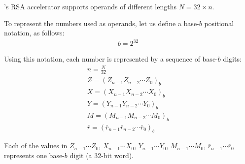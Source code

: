\documentclass[main\_\_EN.tex]{subfiles}
\begin{document}
\chipname{}'s RSA accelerator supports operands of different lengths \begin{math}N = 32 \times n\end{math}.

To represent the numbers used as operands, let us define a base-\begin{math}b\end{math} positional notation, as follows:
\begin{gather*}
    b = 2^{32}
\end{gather*}

Using this notation, each number is represented by a sequence of base-\begin{math}b\end{math} digits:
\begin{gather*}
    n = \frac{N}{32} \\
    Z = ( Z_{n-1} Z_{n-2} \cdots Z_{0} )_{b} \\
    X = ( X_{n-1} X_{n-2} \cdots X_{0} )_{b} \\
    Y = ( Y_{n-1} Y_{n-2} \cdots Y_{0} )_{b} \\
    M = ( M_{n-1} M_{n-2} \cdots M_{0} )_{b} \\
    \overline{r} = ( \overline{r}_{n-1} \overline{r}_{n-2} \cdots \overline{r}_{0} )_{b}
\end{gather*}

Each of the values in
\begin{math}Z_{n-1} \cdots Z_{0}\end{math},
\begin{math}X_{n-1} \cdots X_{0}\end{math},
\begin{math}Y_{n-1} \cdots Y_{0}\end{math},
\begin{math}M_{n-1} \cdots M_{0}\end{math},
\begin{math}\overline{r}_{n-1}\cdots \overline{r}_{0}\end{math} represents one base-\begin{math}b\end{math} digit (a 32-bit word).
\end{document}

